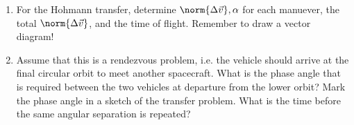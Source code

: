\documentclass[10pt]{article}
\theoremstyle{definition}
\newenvironment{subprob}%
{\renewcommand{\theenumi}{\alph{enumi}}\renewcommand{\labelenumi}{(\theenumi)}\begin{enumerate}}%
{\end{enumerate}}%
\begin{document}
\begin{subprob}
\item For the Hohmann transfer, determine \( \norm{\Delta \vec v}, \alpha \) for each manuever, the total \( \norm{\Delta \vec v}\), and the time of flight. 
    Remember to draw a vector diagram!
\item Assume that this is a rendezvous problem, i.e. the vehicle should arrive at the final circular orbit to meet another spacecraft.
    What is the phase angle that is required between the two vehicles at departure from the lower orbit?
    Mark the phase angle in a sketch of the transfer problem.
    What is the time before the same angular separation is repeated?
\end{subprob}
\end{document}
